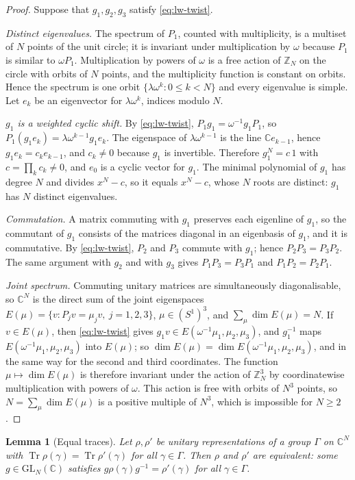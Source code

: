 \documentclass[11pt,a4paper]{amsart}
\newtheorem{lemma}[theorem]{Lemma}
\theoremstyle{definition}
\theoremstyle{remark}
\numberwithin{equation}{section}
\DeclareMathOperator{\Tr}{Tr}        %
\newcommand{\C}{\mathbb{C}}          %
\newcommand{\Z}{\mathbb{Z}}          %
\begin{document}
\begin{proof}
Suppose that $g_1,g_2,g_3$ satisfy \eqref{eq:lw-twist}.

\emph{Distinct eigenvalues.} The spectrum of $P_1$, counted with multiplicity, is a multiset of $N$ points of the unit circle; it is invariant under multiplication by $\omega$ because $P_1$ is similar to $\omega P_1$. Multiplication by powers of $\omega$ is a free action of $\Z_N$ on the circle with orbits of $N$ points, and the multiplicity function is constant on orbits. Hence the spectrum is one orbit $\{\lambda\omega^k:0\le k<N\}$ and every eigenvalue is simple. Let $e_k$ be an eigenvector for $\lambda\omega^k$, indices modulo $N$.

\emph{$g_1$ is a weighted cyclic shift.} By \eqref{eq:lw-twist}, $P_1g_1=\omega^{-1}g_1P_1$, so $P_1(g_1e_k)=\lambda\omega^{k-1}g_1e_k$. The eigenspace of $\lambda\omega^{k-1}$ is the line $\C e_{k-1}$, hence $g_1e_k=c_ke_{k-1}$, and $c_k\neq0$ because $g_1$ is invertible. Therefore $g_1^N=c\,1$ with $c=\prod_kc_k\neq0$, and $e_0$ is a cyclic vector for $g_1$. The minimal polynomial of $g_1$ has degree $N$ and divides $x^N-c$, so it equals $x^N-c$, whose $N$ roots are distinct: $g_1$ has $N$ distinct eigenvalues.

\emph{Commutation.} A matrix commuting with $g_1$ preserves each eigenline of $g_1$, so the commutant of $g_1$ consists of the matrices diagonal in an eigenbasis of $g_1$, and it is commutative. By \eqref{eq:lw-twist}, $P_2$ and $P_3$ commute with $g_1$; hence $P_2P_3=P_3P_2$. The same argument with $g_2$ and with $g_3$ gives $P_1P_3=P_3P_1$ and $P_1P_2=P_2P_1$.

\emph{Joint spectrum.} Commuting unitary matrices are simultaneously diagonalisable, so $\C^N$ is the direct sum of the joint eigenspaces $E(\mu)=\{v:P_jv=\mu_jv,\ j=1,2,3\}$, $\mu\in(S^1)^3$, and $\sum_\mu\dim E(\mu)=N$. If $v\in E(\mu)$, then \eqref{eq:lw-twist} gives $g_1v\in E(\omega^{-1}\mu_1,\mu_2,\mu_3)$, and $g_1^{-1}$ maps $E(\omega^{-1}\mu_1,\mu_2,\mu_3)$ into $E(\mu)$; so $\dim E(\mu)=\dim E(\omega^{-1}\mu_1,\mu_2,\mu_3)$, and in the same way for the second and third coordinates. The function $\mu\mapsto\dim E(\mu)$ is therefore invariant under the action of $\Z_N^3$ by coordinatewise multiplication with powers of $\omega$. This action is free with orbits of $N^3$ points, so $N=\sum_\mu\dim E(\mu)$ is a positive multiple of $N^3$, which is impossible for $N\ge2$.
\end{proof}

\begin{lemma}[Equal traces]
Let $\rho,\rho'$ be unitary representations of a group $\Gamma$ on $\C^N$ with $\Tr\rho(\gamma)=\Tr\rho'(\gamma)$ for all $\gamma\in\Gamma$. Then $\rho$ and $\rho'$ are equivalent: some $g\in\mathrm{GL}_N(\C)$ satisfies $g\rho(\gamma)g^{-1}=\rho'(\gamma)$ for all $\gamma\in\Gamma$.
\end{lemma}
\end{document}
